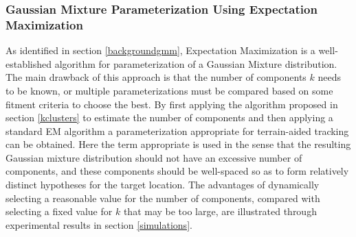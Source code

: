 \documentclass[journal]{IEEEtran}
\begin{document}
\subsubsection{Gaussian Mixture Parameterization Using Expectation Maximization} \label{gmmparamem}
As identified in section \ref{backgroundgmm}, Expectation Maximization is a well-established algorithm for parameterization of a Gaussian Mixture distribution. The main drawback of this approach is that the number of components $k$ needs to be known, or multiple parameterizations must be compared based on some fitment criteria to choose the best. By first applying the algorithm proposed in section \ref{kclusters} to estimate the number of components and then applying a standard EM algorithm a parameterization appropriate for terrain-aided tracking can be obtained. Here the term appropriate is used in the sense that the resulting Gaussian mixture distribution should not have an excessive number of components, and these components should be well-spaced so as to form relatively distinct hypotheses for the target location. The advantages of dynamically selecting a reasonable value for the number of components, compared with selecting a fixed value for $k$ that may be too large, are illustrated through experimental results in section \ref{simulations}.


\end{document}
